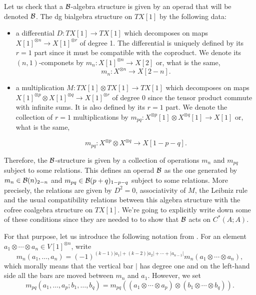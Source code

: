 \documentclass[TFM.tex]{subfiles}
\begin{document}
Let us check that a $\mathcal{B}$-algebra structure is given by an operad that will be denoted $\mathcal{B}$. 
The dg bialgebra structure on $TX[1]$ by the following data:
\begin{itemize}
\item a differential $D:TX[1]\to TX[1]$ which decomposes on maps $X[1]^{\otimes n}\to X[1]^{\otimes r}$ of degree 1. The differential is uniquely defined by its $r=1$ part since it must be compatible with the coproduct. We denote its $(n,1)$-componets by $m_n:X[1]^{\otimes n}\to X[2]$ or, what is the same, 
\begin{equation}\label{mn}
m_n:X^{\otimes n}\to X[2-n].
\end{equation}

\item a multiplication $M:TX[1]\otimes TX[1]\to TX[1]$ which decomposes on maps $X[1]^{\otimes p}\otimes X[1]^{\otimes q}\to X[1]^{\otimes r}$ of degree 0 since the tensor product commute with infinite sums. It is also defined by its $r=1$ part. We denote the collection of $r=1$ multiplications by $m_{pq}:X^{\otimes p}[1]\otimes X^{\otimes q}[1]\to X[1]$ or, what is the same, 

\begin{equation}\label{mpq}
m_{pq}:X^{\otimes p}\otimes X^{\otimes q}\to X[1-p-q].
\end{equation}
\end{itemize}
Therefore, the $\mathcal{B}$-structure is given by a collection of operations $m_n$ and $m_{pq}$
subject to some relations. This defines an operad $\mathcal{B}$ as the one generated by $m_n\in\mathcal{B}(n)_{2-n}$ and $m_{pq}\in\mathcal{B}(p+q)_{1-p-q}$ subject to some relations. More precisely, the relations are given by $D^2=0$, associativity of $M$, the Leibniz rule and the usual compatibility relations between this algebra structure with the cofree coalgebra structure on $TX[1]$. We're going to explicitly write down some of these conditions since they are needed to to show that $\mathcal{B}$ acts on $C^*(A;A)$.  %

For that purpose, let us introduce the following notation from \cite{VO}. For an element $a_1\otimes\cdots\otimes a_n\in V[1]^{\otimes n}$, write
\[
m_n(a_1,\dots,a_n)=(-1)^{(k-1)|a_1|+(k-2)|a_2|+\cdots+|a_{n-1}|}m_n(a_1\otimes\cdots\otimes a_n),
\]
which morally means that the vertical bar $|$ has degree one and on the left-hand
side all the bars are moved between $m_n$ and $a_1$. However, we set
\[
m_{pq}(a_1,\dots, a_p;b_1,\dots, b_q)=m_{pq}((a_1\otimes\cdots\otimes a_p)\otimes(b_1\otimes\cdots\otimes b_q)).
\]
\end{document}
